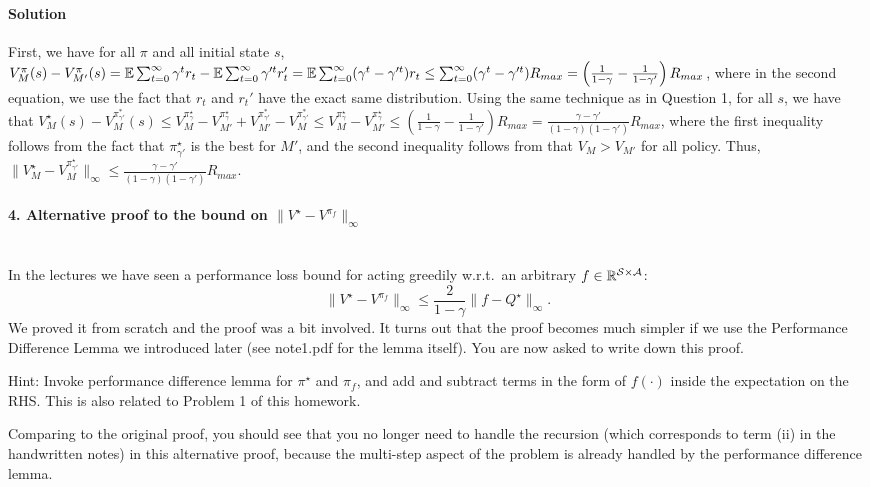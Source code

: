 \documentclass{article}
\begin{document}
\paragraph{Solution}
First, we have for all $\pi$ and all initial state $s$, $V_{M}^\pi(s) - V_{M'}^\pi(s) = \mathbb{E} \sum_{t = 0}^{\infty} \gamma^t r_t - \mathbb{E} \sum_{t = 0}^{\infty} \gamma'^t r_t' = \mathbb{E} \sum_{t = 0}^{\infty} (\gamma^t - \gamma'^t) r_t \leq \sum_{t = 0}^{\infty} (\gamma^t - \gamma'^t) R_{max} = \left(\frac{1}{1-\gamma} - \frac{1}{1-\gamma'}\right)R_{max}$, where in the second equation, we use the fact that $r_t$ and $r_t'$ have the exact same distribution. Using the same technique as in Question 1, for all $s$, we have that $V^\star_M(s) - V^{\pi^*_{\gamma'}}_M(s) \leq V^{\pi^\star_\gamma}_M - V_{M'}^{\pi^\star_\gamma} + V_{M'}^{\pi^*_{\gamma'}} - V^{\pi^*_{\gamma'}}_M \leq V^{\pi^\star_\gamma}_M - V_{M'}^{\pi^\star_\gamma} \leq \left(\frac{1}{1-\gamma} - \frac{1}{1-\gamma'}\right)R_{max} = \frac{\gamma - \gamma'}{(1-\gamma)(1-\gamma')}R_{max}$, where the first inequality follows from the fact that $\pi^\star_{\gamma'}$ is the best for $M'$, and the second inequality follows from that $V_M > V_{M'}$ for all policy. Thus, $\|V_M^\star - V_M^{\pi_{\gamma'}^\star}\|_\infty \leq \frac{\gamma - \gamma'}{(1-\gamma)(1-\gamma')}R_{max}$.

\paragraph{4. Alternative proof to the bound on $\|V^\star - V^{\pi_f}\|_\infty$}~\\
In the lectures we have seen a performance loss bound for acting greedily w.r.t.~an arbitrary $f \in \mathbb{R}^{\mathcal{S}\times\mathcal{A}}$: 
$$
\|V^\star - V^{\pi_f}\|_\infty \le \frac{2}{1-\gamma} \|f - Q^\star\|_\infty.
$$ 
We proved it from scratch and the proof was a bit involved. It turns out that the proof becomes much simpler if we use the Performance Difference Lemma we introduced later (see note1.pdf for the lemma itself). You are now asked to write down this proof. 

Hint: Invoke performance difference lemma for $\pi^\star$ and $\pi_f$, and add and subtract terms in the form of $f(\cdot)$ inside the expectation on the RHS. This is also related to Problem 1 of this homework. 

Comparing to the original proof, you should see that you no longer need to handle the recursion (which corresponds to term (ii) in the handwritten notes) in this alternative proof, because the multi-step aspect of the problem is already handled by the performance difference lemma. 
\end{document}
